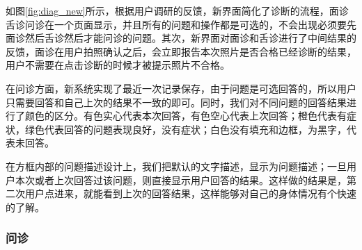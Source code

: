 如图\ref{fig:diag_new}所示，根据用户调研的反馈，新界面简化了诊断的流程，面诊舌诊问诊在一个页面显示，并且所有的问题和操作都是可选的，不会出现必须要先面诊然后舌诊然后才能问诊的问题。其次，新界面对面诊和舌诊进行了中间结果的反馈，面诊在用户拍照确认之后，会立即报告本次照片是否合格已经诊断的结果，用户不需要在点击诊断的时候才被提示照片不合格。

在问诊方面，新系统实现了最近一次记录保存，由于问题是可选回答的，所以用户只需要回答和自己上次的结果不一致的即可。同时，我们对不同问题的回答结果进行了颜色的区分。有色实心代表本次回答，有色空心代表上次回答；橙色代表有症状，绿色代表回答的问题表现良好，没有症状；白色没有填充和边框，为黑字，代表未回答。

在方框内部的问题描述设计上，我们把默认的文字描述，显示为问题描述；一旦用户本次或者上次回答过该问题，则直接显示用户回答的结果。这样做的结果是，第二次用户点进来，就能看到上次的回答结果，这样能够对自己的身体情况有个快速的了解。



\subsubsection{问诊}

